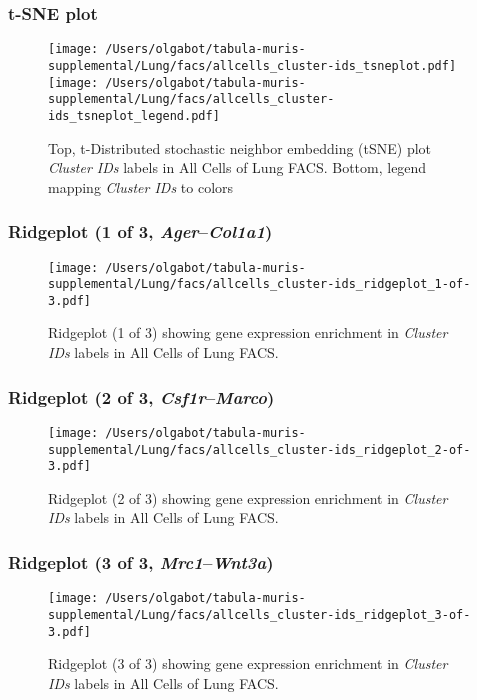 \clearpage
\subsubsection{t-SNE plot}
\begin{figure}[h]
\centering
\texttt{[image: /Users/olgabot/tabula-muris-supplemental/Lung/facs/allcells\_cluster-ids\_tsneplot.pdf]}
\texttt{[image: /Users/olgabot/tabula-muris-supplemental/Lung/facs/allcells\_cluster-ids\_tsneplot\_legend.pdf]}
\caption{Top, t-Distributed stochastic neighbor embedding (tSNE) plot  \emph{Cluster IDs} labels in All Cells of Lung FACS. Bottom, legend mapping \emph{Cluster IDs} to colors}
\end{figure}


\clearpage

\subsubsection{Ridgeplot (1 of 3, \emph{Ager}--\emph{Col1a1})}
\begin{figure}[h]
\centering
\texttt{[image: /Users/olgabot/tabula-muris-supplemental/Lung/facs/allcells\_cluster-ids\_ridgeplot\_1-of-3.pdf]}

\caption{ Ridgeplot (1 of 3)  showing gene expression enrichment in \emph{Cluster IDs} labels in All Cells of Lung FACS. }
\end{figure}


\clearpage

\subsubsection{Ridgeplot (2 of 3, \emph{Csf1r}--\emph{Marco})}
\begin{figure}[h]
\centering
\texttt{[image: /Users/olgabot/tabula-muris-supplemental/Lung/facs/allcells\_cluster-ids\_ridgeplot\_2-of-3.pdf]}

\caption{ Ridgeplot (2 of 3)  showing gene expression enrichment in \emph{Cluster IDs} labels in All Cells of Lung FACS. }
\end{figure}


\clearpage

\subsubsection{Ridgeplot (3 of 3, \emph{Mrc1}--\emph{Wnt3a})}
\begin{figure}[h]
\centering
\texttt{[image: /Users/olgabot/tabula-muris-supplemental/Lung/facs/allcells\_cluster-ids\_ridgeplot\_3-of-3.pdf]}

\caption{ Ridgeplot (3 of 3)  showing gene expression enrichment in \emph{Cluster IDs} labels in All Cells of Lung FACS. }
\end{figure}


